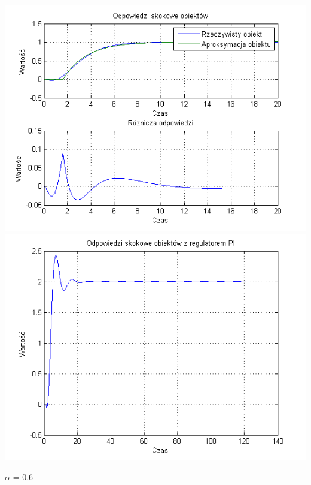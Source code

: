 \documentclass[10pt,a4paper]{article}
\begin{document}
\begin{center}
\includegraphics[scale=1]{images/jeden/skrypt_233.png}\\
\includegraphics[scale=1]{images/jeden/skrypt_234.png}\\
\end{center}
\newpage
$\alpha$ = 0.6
\end{document}
